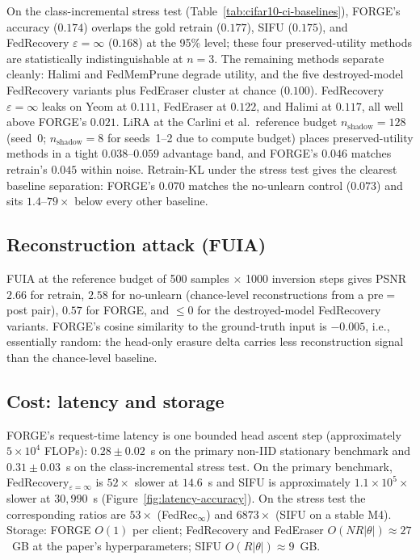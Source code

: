 On the class-incremental stress test (Table~\ref{tab:cifar10-ci-baselines}),
FORGE's accuracy ($0.174$) overlaps the gold retrain ($0.177$), SIFU ($0.175$),
and FedRecovery $\varepsilon{=}\infty$ ($0.168$) at the 95\% level; these four
preserved-utility methods are statistically indistinguishable at $n{=}3$. The
remaining methods separate cleanly: Halimi and FedMemPrune degrade utility, and
the five destroyed-model FedRecovery variants plus FedEraser cluster at chance
($0.100$). FedRecovery $\varepsilon{=}\infty$ leaks on Yeom at $0.111$,
FedEraser at $0.122$, and Halimi at $0.117$, all well above FORGE's $0.021$.
LiRA at the Carlini et al.\ reference budget $n_\mathrm{shadow}{=}128$ (seed~0;
$n_\mathrm{shadow}{=}8$ for seeds~1--2 due to compute budget) places
preserved-utility methods in a tight $0.038$--$0.059$ advantage band, and FORGE's
$0.046$ matches retrain's $0.045$ within noise. Retrain-KL under the stress test
gives the clearest baseline separation: FORGE's $0.070$ matches the no-unlearn
control ($0.073$) and sits $1.4$--$79\times$ below every other baseline.

\subsection{Reconstruction attack (FUIA)}
\label{sec:results-fuia}

FUIA at the reference budget of 500 samples $\times$ 1000 inversion steps gives PSNR
$2.66$ for retrain, $2.58$ for no-unlearn (chance-level reconstructions from a
pre$=$post pair), $0.57$ for FORGE, and $\le 0$ for the destroyed-model FedRecovery
variants. FORGE's cosine similarity to the ground-truth input is $-0.005$, i.e.,
essentially random: the head-only erasure delta carries less reconstruction signal
than the chance-level baseline.

\subsection{Cost: latency and storage}
\label{sec:results-cost}

FORGE's request-time latency is one bounded head ascent step (approximately
$5 \times 10^4$ FLOPs): $0.28 \pm 0.02$~s on the primary non-IID stationary
benchmark and $0.31 \pm 0.03$~s on the class-incremental stress test. On the
primary benchmark, FedRecovery$_{\varepsilon=\infty}$ is $52\times$ slower at
$14.6$~s and SIFU is approximately $1.1 \times 10^5\times$ slower at
$30{,}990$~s (Figure~\ref{fig:latency-accuracy}). On the stress test the
corresponding ratios are $53\times$ (FedRec$_{\infty}$) and $6873\times$
(SIFU on a stable M4). Storage: FORGE $O(1)$ per client; FedRecovery and
FedEraser $O(NR|\theta|) \approx 27$~GB at the paper's hyperparameters; SIFU
$O(R|\theta|) \approx 9$~GB.

